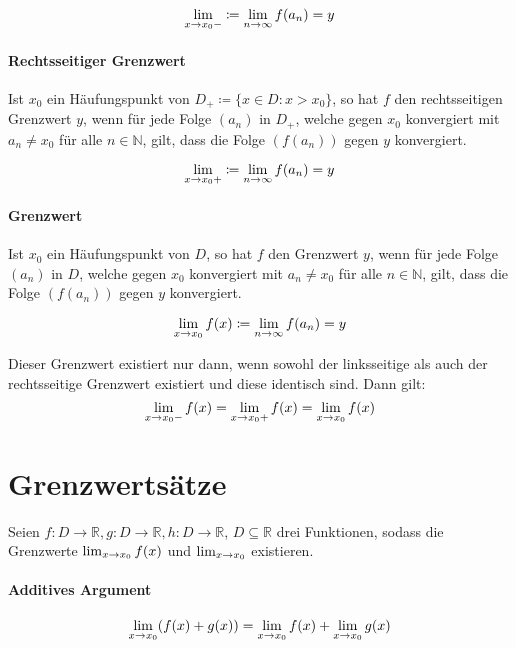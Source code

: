             \[ \lim _ { x \rightarrow x _ 0 - } \coloneqq \lim_{n \to \infty} f(a _ n) = y \]

        \paragraph{Rechtsseitiger Grenzwert}
            Ist $ x _ 0 $ ein Häufungspunkt von $ D _ + \coloneqq \{ x \in D : x > x _ 0 \} $, so hat $ f $ den rechtsseitigen Grenzwert $ y $, wenn für jede Folge $ (a _ n) $ in $ D _ + $, welche gegen $ x _ 0 $ konvergiert mit $ a _ n \neq x _ 0 $ für alle $ n \in \mathbb{N} $, gilt, dass die Folge $ (f(a _ n)) $ gegen $ y $ konvergiert.

            \[ \lim _ { x \rightarrow x _ 0 + } \coloneqq \lim_{n \to \infty} f(a _ n) = y \]

        \paragraph{Grenzwert}
            Ist $ x _ 0 $ ein Häufungspunkt von $ D $, so hat $ f $ den Grenzwert $ y $, wenn für jede Folge $ (a _ n) $ in $ D $, welche gegen $ x _ 0 $ konvergiert mit $ a _ n \neq x _ 0 $ für alle $ n \in \mathbb{N} $, gilt, dass die Folge $ (f(a _ n)) $ gegen $ y $ konvergiert.

            \[ \lim_{x \to x_0 } f(x) \coloneqq \lim_{n \to \infty} f(a _ n) = y \]

            Dieser Grenzwert existiert nur dann, wenn sowohl der linksseitige als auch der rechtsseitige Grenzwert existiert und diese identisch sind. Dann gilt:
            \begin{equation*}
                \lim _ { x \rightarrow x _ 0 - } f(x) = \lim _ { x \rightarrow x _ 0 + } f(x) = \lim_{x \to x_0 } f(x)
            \end{equation*}

    \section{Grenzwertsätze}
        Seien $ f : D \rightarrow \mathbb{R}, g : D \rightarrow \mathbb{R}, h : D \rightarrow \mathbb{R} $, $ D \subseteq \mathbb{R} $ drei Funktionen, sodass die Grenzwerte $ \lim_{x \to x_0 } f(x) $ und $ \lim_{x \to x_0 } $ existieren.

        \paragraph{Additives Argument}
            \[ \lim_{x \to x_0 } (f(x) + g(x)) = \lim_{x \to x_0 } f(x) + \lim_{x \to x_0 } g(x) \]

